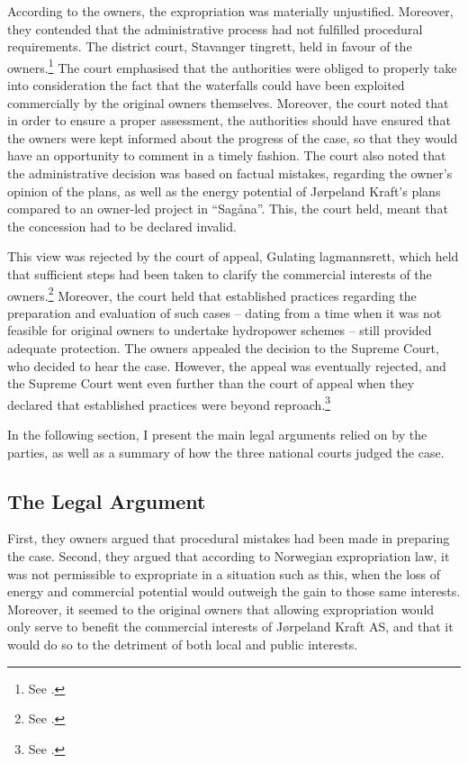 According to the owners, the expropriation was materially unjustified. Moreover, they contended that the administrative process had not fulfilled procedural requirements. The district court, Stavanger tingrett, held in favour of the owners.\footnote{See \cite{jorpeland09}.} The court emphasised that the authorities were obliged to properly take into consideration the fact that the waterfalls could have been exploited commercially by the original owners themselves. Moreover, the court noted that in order to ensure a proper assessment, the authorities should have ensured that the owners were kept informed about the progress of the case, so that they would have an opportunity to comment in a timely fashion. The court also noted that the administrative decision was based on factual mistakes, regarding the owner's opinion of the plans, as well as the energy potential of Jørpeland Kraft's plans compared to an owner-led project in ``Sagåna''. This, the court held, meant that the concession had to be declared invalid.

This view was rejected by the court of appeal, Gulating lagmannsrett, which held that sufficient steps had been taken to clarify the commercial interests of the owners.\footnote{See \cite{jorpeland11a}.} Moreover, the court held that established practices regarding the preparation and evaluation of such cases -- dating from a time when it was not feasible for original owners to undertake hydropower schemes -- still provided adequate protection. The owners appealed the decision to the Supreme Court, who decided to hear the case. However, the appeal was eventually rejected, and the Supreme Court went even further than the court of appeal when they declared that established practices were beyond reproach.\footnote{See \cite{jorpeland11}.}

In the following section, I present the main legal arguments relied on by the parties, as well as a summary of how the three national courts judged the case.

\subsection{The Legal Argument}\label{view}

First, they owners argued that procedural mistakes had been made in preparing the case. Second, they argued that according to Norwegian expropriation law, it was not permissible to expropriate in a situation such as this, when the loss of energy and commercial potential would outweigh the gain to those same interests. Moreover, it seemed to the original owners that allowing expropriation would only serve to benefit the commercial interests of Jørpeland Kraft AS, and that it would do so to the detriment of both local and public interests. 


